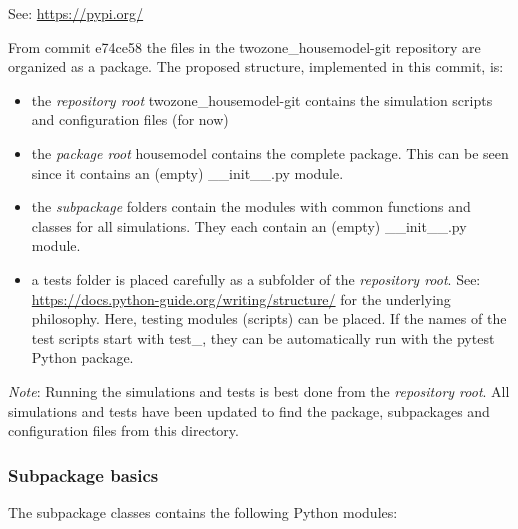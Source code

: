 See: \url{https://pypi.org/}

From commit \textsf{e74ce58} the files in the \textsf{twozone\_housemodel-git} repository are organized as a package. The proposed structure, implemented in this commit, is:


\begin{itemize}
	\item the \emph{repository root} \textsf{twozone\_housemodel-git} contains the simulation scripts and configuration files (for now) 
	\item the \emph{package root} \textsf{housemodel} contains the complete package. This can be seen since it contains an (empty) \textsf{\_\_init\_\_.py} module.
	\item the \emph{subpackage} folders contain the modules with common functions and classes for all simulations. They each contain an (empty) \textsf{\_\_init\_\_.py} module.
	\item a \textsf{tests} folder is placed carefully as a subfolder of the \emph{repository root}. 
	See: \url{https://docs.python-guide.org/writing/structure/} for the underlying philosophy. Here, testing modules (scripts) can be placed. If the names of the test scripts start with \textsf{test\_}, they can be automatically run with the \textsf{pytest} Python package.
\end{itemize}

\textit{Note}: Running the simulations and tests is best done from the \emph{repository root}. All simulations and tests have been updated to find the package, subpackages and configuration files from this directory.

\subsubsection{Subpackage \textsf{basics}}
 The subpackage \textsf{classes} contains the following Python modules:

